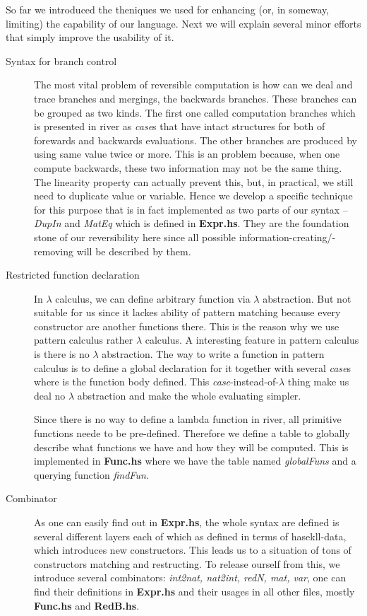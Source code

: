 \documentclass[a4paper]{article}
\begin{document}
So far we introduced the theniques we used for enhancing (or, in someway, limiting) the capability of our language. Next we will explain several minor efforts that simply improve the usability of it.

\begin{description}
\item[Syntax for branch control] {
    The most vital problem of reversible computation is how can we deal and trace branches and mergings, the backwards branches. These branches can be grouped as two kinds. The first one called computation branches which is presented in river as \textit{case}s that have intact structures for both of forewards and backwards evaluations. The other branches are produced by using same value twice or more. This is an problem because, when one compute backwards, these two information may not be the same thing. The linearity property can actually prevent this, but, in practical, we still need to duplicate value or variable. Hence we develop a specific technique for this purpose that is in fact implemented as two parts of our syntax -- \textit{DupIn} and \textit{MatEq} which is defined in \textbf{Expr.hs}. They are the foundation stone of our reversibility here since all possible information-creating/-removing will be described by them.
}
\item[Restricted function declaration]{
    In $\lambda$ calculus, we can define arbitrary function via $\lambda$ abstraction. But not suitable for us since it lackes ability of pattern matching because every constructor are another functions there. This is the reason why we use pattern calculus rather $\lambda$ calculus. A interesting feature in pattern calculus is there is no $\lambda$ abstraction. The way to write a function in pattern calculus is to define a global declaration for it together with several \textit{case}s where is the function body defined. This \textit{case}-instead-of-$\lambda$ thing make us deal no $\lambda$ abstraction and make the whole evaluating simpler.

    Since there is no way to define a lambda function in river, all primitive functions neede to be pre-defined. Therefore we define a table to globally describe what functions we have and how they will be computed. This is implemented in \textbf{Func.hs} where we have the table named \textit{globalFuns} and a querying function \textit{findFun}.
}
\item[Combinator]{
    As one can easily find out in \textbf{Expr.hs}, the whole syntax are defined is several different layers each of which as defined in terms of hasekll-data, which introduces new constructors. This leads us to a situation of tons of constructors matching and restructing. To release ourself from this, we introduce several combinators: \textit{int2nat, nat2int, redN, mat, var}, one can find their definitions in \textbf{Expr.hs} and their usages in all other files, mostly \textbf{Func.hs} and \textbf{RedB.hs}.
}
\end{description}
\end{document}
